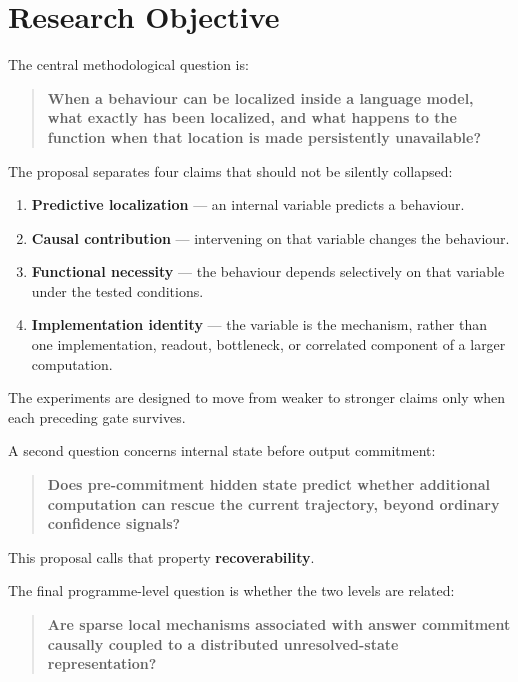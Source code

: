 \section{Research Objective}\label{research-objective}

The central methodological question is:

\begin{quote}
\textbf{When a behaviour can be localized inside a language model, what exactly has been localized, and what happens to the function when that location is made persistently unavailable?}
\end{quote}

The proposal separates four claims that should not be silently collapsed:

\begin{enumerate}
\def\labelenumi{\arabic{enumi}.}
\tightlist
\item
  \textbf{Predictive localization} --- an internal variable predicts a behaviour.
\item
  \textbf{Causal contribution} --- intervening on that variable changes the behaviour.
\item
  \textbf{Functional necessity} --- the behaviour depends selectively on that variable under the tested conditions.
\item
  \textbf{Implementation identity} --- the variable is the mechanism, rather than one implementation, readout, bottleneck, or correlated component of a larger computation.
\end{enumerate}

The experiments are designed to move from weaker to stronger claims only when each preceding gate survives.

A second question concerns internal state before output commitment:

\begin{quote}
\textbf{Does pre-commitment hidden state predict whether additional computation can rescue the current trajectory, beyond ordinary confidence signals?}
\end{quote}

This proposal calls that property \textbf{recoverability}.

The final programme-level question is whether the two levels are related:

\begin{quote}
\textbf{Are sparse local mechanisms associated with answer commitment causally coupled to a distributed unresolved-state representation?}
\end{quote}

